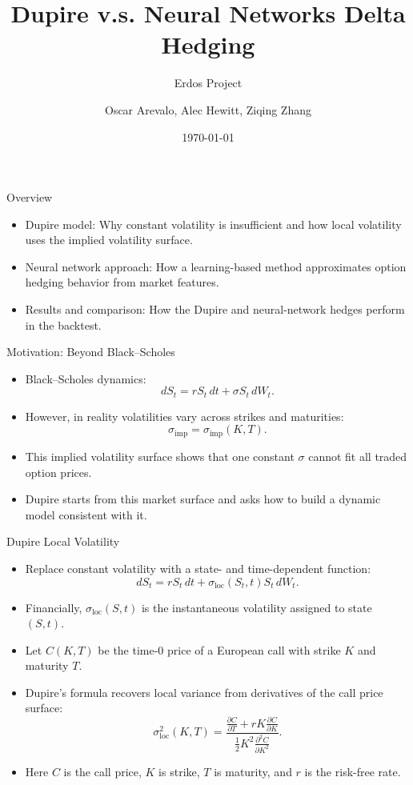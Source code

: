 \documentclass[aspectratio=169]{beamer}
\title[]{
Dupire v.s. Neural Networks Delta Hedging}
\subtitle{Erdos Project}
\author{Oscar Arevalo, Alec Hewitt, Ziqing Zhang}
\date{\today}
\begin{document}
\begin{frame}
  \titlepage
\end{frame}

\begin{frame}{Overview}
\begin{itemize}
    \item Dupire model: Why constant volatility is insufficient and how local volatility uses the implied volatility surface.
    \item Neural network approach: How a learning-based method approximates option hedging behavior from market features.
    \item Results and comparison: How the Dupire and neural-network hedges perform in the backtest.
\end{itemize}
\end{frame}

\begin{frame}{Motivation: Beyond Black--Scholes}
  \begin{itemize}
    \item Black--Scholes dynamics:
    \[
      dS_t = rS_t\,dt + \sigma S_t\,dW_t .
    \]
    \item However, in reality volatilities vary across strikes and maturities:
    \[
      \sigma_{\mathrm{imp}} = \sigma_{\mathrm{imp}}(K,T).
    \]
    \item This implied volatility surface shows that one constant $\sigma$ cannot fit all traded option prices.
    \item Dupire starts from this market surface and asks how to build a dynamic model consistent with it.
  \end{itemize}
\end{frame}

\begin{frame}{Dupire Local Volatility}
  \begin{itemize}
    \item Replace constant volatility with a state- and time-dependent function:
    \[
      dS_t = rS_t\,dt + \sigma_{\mathrm{loc}}(S_t,t)S_t\,dW_t .
    \]
    \item Financially, $\sigma_{\mathrm{loc}}(S,t)$ is the instantaneous volatility assigned to state $(S,t)$.
    \item Let $C(K,T)$ be the time-0 price of a European call with strike $K$ and maturity $T$.
    \item Dupire's formula recovers local variance from derivatives of the call price surface:
    \[
      \sigma_{\mathrm{loc}}^2(K,T)
      =
      \frac{\frac{\partial C}{\partial T}
      + rK\frac{\partial C}{\partial K}}
      {\frac{1}{2}K^2\frac{\partial^2 C}{\partial K^2}}.
    \]
    \item Here $C$ is the call price, $K$ is strike, $T$ is maturity, and $r$ is the risk-free rate.
  \end{itemize}
\end{frame}
\end{document}
